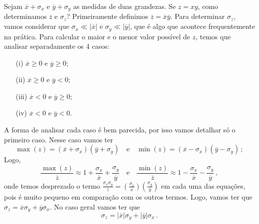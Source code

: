 \documentclass[12pt, a4paper]{article}
\begin{document}
Sejam $\overline{x}+\sigma_x$ e $\overline{y}+\sigma_y$ as medidas de duas grandezas. Se $z=xy$, como determinamos $\overline{z}$ e $\sigma_z$? Primeiramente definimos $\overline{z}=\overline{x}\overline{y}$. Para determinar $\sigma_z$, vamos considerar que $\sigma_x\ll |\overline{x}|$ e $\sigma_y\ll |\overline{y}|$, que é algo que acontece frequentemente na prática. Para calcular o maior e o menor valor possível de $z$, temos que analisar separadamente os 4 casos: 
\begin{enumerate}
	\item[(i)] $\overline{x}\ge 0$ e $\overline{y}\ge 0$;
	\item[(ii)] $\overline{x}\ge 0$ e $\overline{y}<0$;
	\item[(iii)] $\overline{x}<0$ e $\overline{y}\ge 0$;
	\item[(iv)] $\overline{x}<0$ e $\overline{y}<0$.
\end{enumerate}
A forma de analisar cada caso é bem parecida, por isso vamos detalhar só o primeiro caso. Nesse caso vamos ter $$\max(z)=(\overline{x}+\sigma_x)(\overline{y}+\sigma_y)\quad\text{e}\quad\min(z)=(\overline{x}-\sigma_x)(\overline{y}-\sigma_y)\,;$$
Logo, 
$$\frac{\max(z)}{\overline{z}}\approx 1+\frac{\sigma_x}{\overline{x}}+\frac{\sigma_y}{\overline{y}}\quad\text{e}\quad\frac{\min(z)}{\overline{z}}\approx 1-\frac{\sigma_x}{\overline{x}}-\frac{\sigma_y}{\overline{y}}\,,$$
onde temos desprezado o termo $\frac{\sigma_x\sigma_y}{\overline{z}}=(\frac{\sigma_x}{\overline{x}})(\frac{\sigma_y}{\overline{y}})$ em cada uma das equações, pois é muito pequeno em comparação com os outros termos. Logo, vamos ter que $\sigma_z=\overline{x}\sigma_y+\overline{y}\sigma_x$. No caso geral vamos ter que
$$\sigma_z=|\overline{x}|\sigma_y+|\overline{y}|\sigma_x\,.$$
\end{document}

